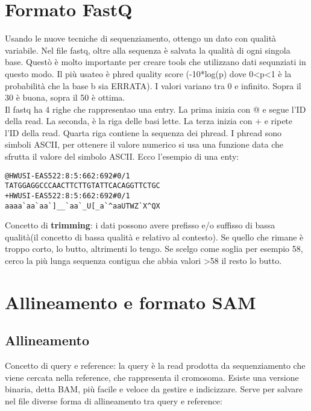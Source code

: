\chapter{Formato FastQ}
Usando le nuove tecniche di sequenziamento, ottengo un dato con qualità variabile. Nel file fastq, oltre alla sequenza è salvata la qualità di ogni singola base. Questò è molto importante per creare tools che utilizzano dati sequnziati in questo modo.
Il più usateo è phred quality score (-10*log(p) dove 0<p<1 è la probabilità che la base b sia ERRATA). I valori variano tra 0 e infinito. Sopra il 30 è buona, sopra il 50 è ottima.\\
Il fastq ha 4 righe che rappresentao una entry. La prima inizia con @ e segue l'ID della read. La seconda, è la riga delle basi lette. La terza inizia con + e ripete l'ID della read. Quarta riga contiene la sequenza dei phread. I phread sono simboli ASCII, per ottenere il valore numerico si usa una funzione data che sfrutta il valore del simbolo ASCII. Ecco l'esempio di una enty:\\

\begin{tcolorbox}
\verb|@HWUSI-EAS522:8:5:662:692#0/1|\\
\verb|TATGGAGGCCCAACTTCTTGTATTCACAGGTTCTGC|\\
\verb|+HWUSI-EAS522:8:5:662:692#0/1|\\
\verb|aaaa`aa`aa`]__`aa`_U[_a`^aaUTWZ`X^QX|
\end{tcolorbox}

Concetto di \textbf{trimming}: i dati possono avere prefisso e/o suffisso di bassa qualità(il concetto di bassa qualità e relativo al contesto). Se quello che rimane è troppo corto, lo butto, altrimenti lo tengo.
Se scelgo come soglia per esempio 58, cerco la più lunga sequenza contigua che abbia valori >58 il resto lo butto.

\chapter{Allineamento e formato SAM}
\section{Allineamento}
Concetto di query e reference: la query è la read prodotta da sequenziamento che viene cercata nella reference, che rappresenta il cromosoma. Esiste una versione binaria, detta BAM, più facile e veloce da gestire e indicizzare.
Serve per salvare nel file diverse forma di allineamento tra query e reference:


